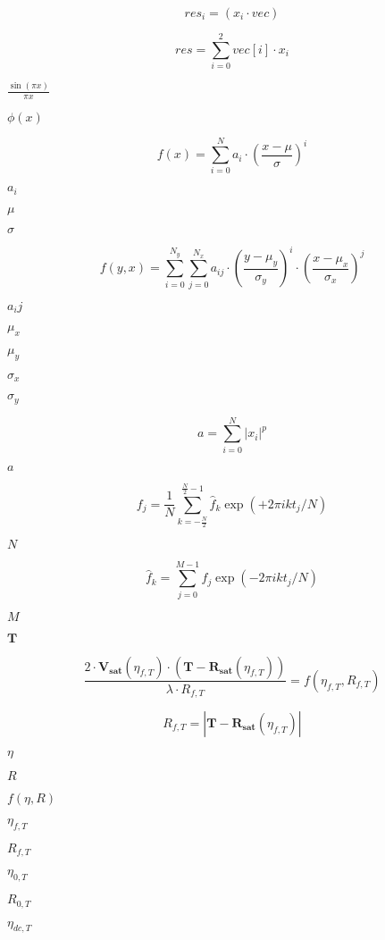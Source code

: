 \documentclass{article}
\begin{document}
\[ res_i = (x_i \cdot vec) \]
\pagebreak

\[ res = \sum_{i=0}^2 vec[i] \cdot x_i \]
\pagebreak

$ \frac{\sin(\pi x)}{\pi x} $
\pagebreak

$ \phi(x) $
\pagebreak

\[ f\left( x \right) = \sum_{i=0}^{N} a_i \cdot \left( \frac{x-\mu}{\sigma} \right)^i \]
\pagebreak

$a_i$
\pagebreak

$\mu$
\pagebreak

$\sigma$
\pagebreak

\[ f\left( y, x \right) = \sum_{i=0}^{N_y} \sum_{j=0}^{N_x} a_{ij} \cdot \left( \frac{y-\mu_y}{\sigma_y} \right)^i \cdot \left( \frac{x-\mu_x}{\sigma_x} \right)^j \]
\pagebreak

$a_ij$
\pagebreak

$\mu_x$
\pagebreak

$\mu_y$
\pagebreak

$\sigma_x$
\pagebreak

$\sigma_y$
\pagebreak

\[ a = \sum_{i=0}^{N} |x_i|^p \]
\pagebreak

$a$
\pagebreak

\[ f_j = \frac{1}{N} \sum_{k=-\frac{N}{2}}^{\frac{N}{2}-1} \hat{f}_k \exp(+2\pi i k t_j / N) \]
\pagebreak

$ N $
\pagebreak

\[ \hat{f}_k = \sum_{j=0}^{M-1} f_j \exp(-2\pi i k t_j / N) \]
\pagebreak

$ M $
\pagebreak

$\mathbf{T}$
\pagebreak

\[ \frac{2 \cdot \mathbf{V_{sat}}\left( \eta_{f,T} \right) \cdot \left( \mathbf{T} - \mathbf{R_{sat}}\left(\eta_{f,T}\right) \right)}{\lambda \cdot R_{f,T}} = f\left(\eta_{f,T}, R_{f,T}\right) \]
\pagebreak

\[ R_{f,T} = \left|\mathbf{T} - \mathbf{R_{sat}}\left(\eta_{f,T} \right)\right| \]
\pagebreak

$\eta$
\pagebreak

$R$
\pagebreak

$f\left(\eta,R\right)$
\pagebreak

$\eta_{f,T}$
\pagebreak

$R_{f,T}$
\pagebreak

$\eta_{0,T}$
\pagebreak

$R_{0,T}$
\pagebreak

$\eta_{dc,T}$
\pagebreak
\end{document}

